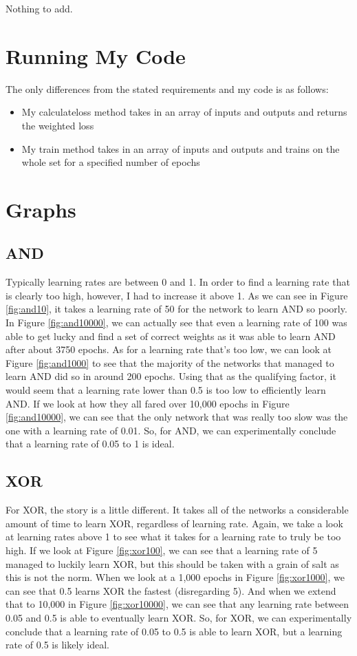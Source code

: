 \documentclass[12pt]{article}
\begin{document}
Nothing to add.

\section{Running My Code}

The only differences from the stated requirements and my code is as follows:
\begin{itemize}
  \item My calculateloss method takes in an array of inputs and outputs and returns the weighted loss
  \item My train method takes in an array of inputs and outputs and trains on the whole set for a specified number of epochs
\end{itemize}

\section{Graphs}

\subsection{AND}
Typically learning rates are between 0 and 1.
In order to find a learning rate that is clearly too high, however, I had to increase it above 1.
As we can see in Figure \ref{fig:and10}, it takes a learning rate of 50 for the network to learn AND so poorly.
In Figure \ref{fig:and10000}, we can actually see that even a learning rate of 100 was able to get lucky and find a set of correct weights as it was able to learn AND after about 3750 epochs.
As for a learning rate that's too low, we can look at Figure \ref{fig:and1000} to see that the majority of the networks that managed to learn AND did so in around 200 epochs.
Using that as the qualifying factor, it would seem that a learning rate lower than 0.5 is too low to efficiently learn AND.
If we look at how they all fared over 10,000 epochs in Figure \ref{fig:and10000}, we can see that the only network that was really too slow was the one with a learning rate of 0.01.
So, for AND, we can experimentally conclude that a learning rate of 0.05 to 1 is ideal.

\subsection{XOR}

For XOR, the story is a little different.
It takes all of the networks a considerable amount of time to learn XOR, regardless of learning rate.
Again, we take a look at learning rates above 1 to see what it takes for a learning rate to truly be too high.
If we look at Figure \ref{fig:xor100}, we can see that a learning rate of 5 managed to luckily learn XOR, but this should be taken with a grain of salt as this is not the norm.
When we look at a 1,000 epochs in Figure \ref{fig:xor1000}, we can see that 0.5 learns XOR the fastest (disregarding 5).
And when we extend that to 10,000 in Figure \ref{fig:xor10000}, we can see that any learning rate between 0.05 and 0.5 is able to eventually learn XOR.
So, for XOR, we can experimentally conclude that a learning rate of 0.05 to 0.5 is able to learn XOR, but a learning rate of 0.5 is likely ideal.
\end{document}
